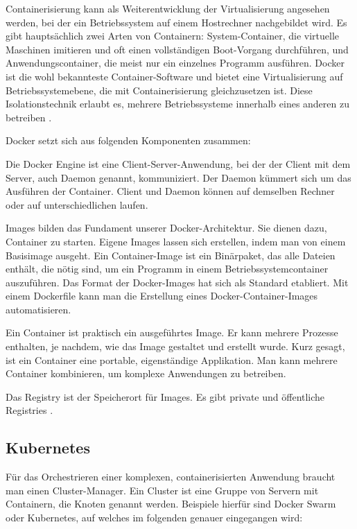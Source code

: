 {Containerisierung kann als Weiterentwicklung der Virtualisierung angesehen werden, bei der ein Betriebssystem auf einem Hostrechner nachgebildet wird. Es gibt hauptsächlich zwei Arten von Containern: System-Container, die virtuelle Maschinen imitieren und oft einen vollständigen Boot-Vorgang durchführen, und Anwendungscontainer, die meist nur ein einzelnes Programm ausführen. Docker ist die wohl bekannteste Container-Software und bietet eine Virtualisierung auf Betriebssystemebene, die mit Containerisierung gleichzusetzen ist. Diese Isolationstechnik erlaubt es, mehrere Betriebssysteme innerhalb eines anderen zu betreiben \cite[S. 54-59]{stender} \cite[S.18]{burns1} \cite[S.63]{riti}.

Docker setzt sich aus folgenden Komponenten zusammen:

Die Docker Engine ist eine Client-Server-Anwendung, bei der der Client mit dem Server, auch Daemon genannt, kommuniziert. Der Daemon kümmert sich um das Ausführen der Container. Client und Daemon können auf demselben Rechner oder auf unterschiedlichen laufen.

Images bilden das Fundament unserer Docker-Architektur. Sie dienen dazu, Container zu starten. Eigene Images lassen sich erstellen, indem man von einem Basisimage ausgeht. Ein Container-Image ist ein Binärpaket, das alle Dateien enthält, die nötig sind, um ein Programm in einem Betriebssystemcontainer auszuführen. Das Format der Docker-Images hat sich als Standard etabliert. Mit einem Dockerfile kann man die Erstellung eines Docker-Container-Images automatisieren.

Ein Container ist praktisch ein ausgeführtes Image. Er kann mehrere Prozesse enthalten, je nachdem, wie das Image gestaltet und erstellt wurde. Kurz gesagt, ist ein Container eine portable, eigenständige Applikation. Man kann mehrere Container kombinieren, um komplexe Anwendungen zu betreiben.

Das Registry ist der Speicherort für Images. Es gibt private und öffentliche Registries \cite [S.16-18]{burns1} \cite[S.64-65]{riti}.


\subsection{Kubernetes}

Für das Orchestrieren einer komplexen, containerisierten Anwendung braucht man einen Cluster-Manager. Ein Cluster ist eine Gruppe von Servern mit Containern, die Knoten genannt werden. Beispiele hierfür sind Docker Swarm oder Kubernetes, auf welches im folgenden genauer eingegangen wird:

}
